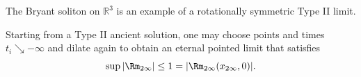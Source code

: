 \begin{example}
\label{ch08-ex-bryant-soliton}
The Bryant soliton on \(\mathbb R^3\) is an example of a rotationally symmetric Type II limit.
\end{example}

\begin{remark}
\label{ch08-rem-third-dilation}
Starting from a Type II ancient solution, one may choose points and times \(t_i\searrow -\infty\) and dilate again to obtain an eternal pointed limit that satisfies
\[
\sup |\Rm_{2\infty}|\le 1 = |\Rm_{2\infty}(x_{2\infty},0)|.
\]
\end{remark}
